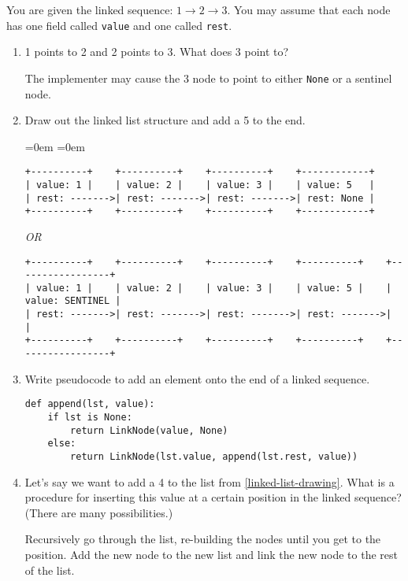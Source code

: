 %
%


You are given the linked sequence: $1 \rightarrow 2 \rightarrow 3$.  You may assume that each node has one field called \texttt{value} and one called \texttt{rest}.
        \begin{enumerate}
            \item 1 points to 2 and 2 points to 3. What does 3 point to? \\
                \begin{answer}
				The implementer may cause the 3 node to point to either \texttt{None} or a sentinel node.
				\end{answer}
            \item \label{linked-list-drawing} Draw out the linked list structure and add a 5 to the end.
				\begin{answer}
				\leftmargin=0em
				\itemindent=0em
				{ \small
				\begin{verbatim}
+----------+    +----------+    +----------+    +------------+
| value: 1 |    | value: 2 |    | value: 3 |    | value: 5   |
| rest: ------->| rest: ------->| rest: ------->| rest: None |
+----------+    +----------+    +----------+    +------------+
				\end{verbatim}
				\textit{OR}
				\begin{verbatim}
+----------+    +----------+    +----------+    +----------+    +-----------------+
| value: 1 |    | value: 2 |    | value: 3 |    | value: 5 |    | value: SENTINEL |
| rest: ------->| rest: ------->| rest: ------->| rest: ------->|                 |
+----------+    +----------+    +----------+    +----------+    +-----------------+
				\end{verbatim} }
				\end{answer}
            \item Write pseudocode to add an element onto the end of a linked sequence.
				\begin{answer}
				\begin{lstlisting}[numbers=none]
def append(lst, value):
	if lst is None:
		return LinkNode(value, None)
	else:
		return LinkNode(lst.value, append(lst.rest, value))
				\end{lstlisting}
				\end{answer}
				\vspace{1in}
            \item Let's say we want to add a 4 to the list from \ref{linked-list-drawing}.
				What is a procedure for inserting this value at a certain position in the linked sequence?
				(There are many possibilities.) \\
                \begin{answer}
				Recursively go through the list, re-building the nodes until you get to the position.
				Add the new node to the new list and link the new node to the rest of the list.
				\end{answer}
				\vspace{.25in}
        \end{enumerate}
